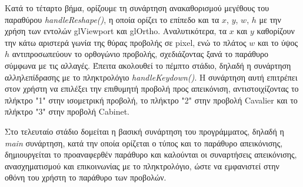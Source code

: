 Κατά το τέταρτο βήμα, ορίζουμε τη συνάρτηση ανακαθορισμού μεγέθους του παραθύρου \emph{\textlatin{handleReshape()}}, η οποία ορίζει το επίπεδο και τα $x$, $y$, $w$, $h$ με την χρήση των εντολών \textlatin{glViewport} και \textlatin{glOrtho}. Αναλυτικότερα, τα $x$ και $y$ καθορίζουν την κάτω αριστερά γωνία της θύρας προβολής σε \textlatin{pixel}, ενώ το πλάτος $w$ και το ύψος $h$ αντιπροσωπεύουν το ορθογώνιο προβολής, σχεδιάζοντας ξανά το παράθυρο σύμφωνα με τις αλλαγές. Έπειτα ακολουθεί το πέμπτο στάδιο, δηλαδή η συνάρτηση αλληλεπίδρασης με το πληκτρολόγιο \emph{\textlatin{handleKeydown()}}. Η συνάρτηση αυτή επιτρέπει στον χρήστη να επιλέξει την επιθυμητή προβολή προς απεικόνιση, αντιστοιχίζοντας το πλήκτρο "1" στην ισομετρική προβολή, το πλήκτρο "2" στην προβολή \textlatin{Cavalier} και το πλήκτρο "3" στην προβολή \textlatin{Cabinet}. \par

Στο τελευταίο στάδιο δομείται η βασική συνάρτηση του προγράμματος, δηλαδή η \emph{\textlatin{main}} συνάρτηση, κατά την οποία ορίζεται ο τύπος και το παράθυρο απεικόνισης, δημιουργείται το προαναφερθέν παράθυρο και καλούνται οι συναρτήσεις απεικόνισης, ανασχηματισμού και επικοινωνίας με το πληκτρολόγιο, ώστε να εμφανιστεί στην οθόνη του χρήστη το παράθυρο των προβολών.

\newpage